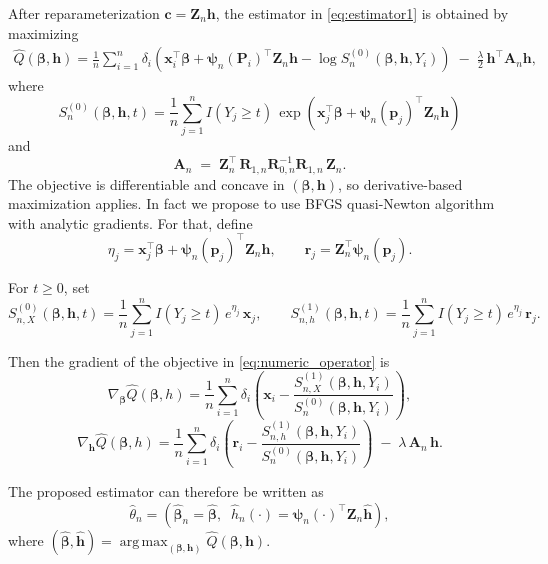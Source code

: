 \documentclass[11pt]{article}
\DeclareMathOperator*{\argmax}{arg\,max}
\begin{document}
After reparameterization $\mathbf c=\mathbf Z_n\mathbf h$, the estimator in \eqref{eq:estimator1} is obtained by maximizing
\begin{align}\label{eq:numeric_operator}
	\hat Q(\bm \beta, \bm h) = \frac{1}{n}\sum_{i=1}^n \delta_i\!\left(
	\bm x_i^\top \bm\beta + \bm{\psi}_n(\bm P_i)^\top \mathbf Z_n \mathbf h
	- \log S_n^{(0)}(\bm\beta,\mathbf h,Y_i)\right)
	\;-\; \frac{\lambda}{2}\,\mathbf h^\top \mathbf A_n \mathbf h,
\end{align}
where
\[
S_{n}^{(0)}(\bm{\beta}, \mathbf{h}, t)
= \frac{1}{n}\sum_{j=1}^n I(Y_j\ge t)\,
\exp\!\left(\bm{x}_j^\top \bm\beta + \bm{\psi}_n(\bm{p}_j)^\top \mathbf Z_n \mathbf h\right)
\]
and
\[
\mathbf A_n \;=\; \mathbf Z_n^\top\,\mathbf R_{1,n}\mathbf R_{0,n}^{-1}\mathbf R_{1,n}\,\mathbf Z_n.
\]
The objective is differentiable and concave in $(\bm\beta,\mathbf h)$, so derivative-based maximization applies. In fact we propose to use BFGS quasi-Newton algorithm \citep{nocedal2006numerical} with analytic gradients. For that,  define
\[
\eta_j = \bm{x}_j^\top \bm\beta + \bm{\psi}_n(\bm{p}_j)^\top \mathbf Z_n \mathbf h,
\qquad 
\mathbf r_j = \mathbf Z_n^\top \bm{\psi}_n(\bm{p}_j).
\]

For \(t \ge 0\), set
\[
S_{n,X}^{(0)}(\bm\beta,\mathbf h,t) = \frac{1}{n}\sum_{j=1}^n I(Y_j \ge t)\,e^{\eta_j}\,\bm{x}_j,
\qquad
S_{n,h}^{(1)}(\bm\beta,\mathbf h,t) = \frac{1}{n}\sum_{j=1}^n I(Y_j \ge t)\,e^{\eta_j}\,\mathbf r_j.
\]

Then the gradient of the objective in \eqref{eq:numeric_operator} is
\[
\nabla_{\bm\beta}\hat Q(\bm \beta, h)
= \frac{1}{n}\sum_{i=1}^n \delta_i \left(
\bm{x}_i - \frac{S_{n,X}^{(1)}(\bm\beta,\mathbf h,Y_i)}{S_n^{(0)}(\bm\beta,\mathbf h,Y_i)}
\right),
\]
\[
\nabla_{\mathbf h}\hat Q(\bm \beta, h)
= \frac{1}{n}\sum_{i=1}^n \delta_i \left(
\mathbf r_i - \frac{S_{n,h}^{(1)}(\bm\beta,\mathbf h,Y_i)}{S_n^{(0)}(\bm\beta,\mathbf h,Y_i)}
\right) \;-\; \lambda\,\mathbf A_n\,\mathbf h.
\]



The proposed estimator can therefore be written as 
\begin{equation}\label{eq:estimator}
\hat{\theta}_n = \left(\hat{\bm \beta}_n = \hat{\bm \beta},\;\;
\hat h_n(\cdot) = \bm{\psi}_n(\cdot)^\top \mathbf Z_n \hat{\mathbf{h}}\right),
\end{equation}
where $(\hat{\bm\beta},\hat{\mathbf{h}}) = \argmax_{(\bm \beta,\mathbf{h}) } \hat Q(\bm \beta,\mathbf{h})$. 
 
\end{document}
